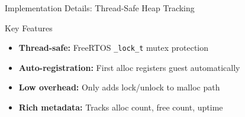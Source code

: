 \documentclass[aspectratio=169, 10pt]{beamer}
\begin{document}
\begin{frame}{Implementation Details: Thread-Safe Heap Tracking}
    \vspace{0.1cm}
    \begin{exampleblock}{Key Features}
        \begin{itemize}\setlength{\itemsep}{2pt}
            \item \textbf{Thread-safe:} FreeRTOS \texttt{\_lock\_t} mutex protection
            \item \textbf{Auto-registration:} First alloc registers guest automatically
            \item \textbf{Low overhead:} Only adds lock/unlock to malloc path
            \item \textbf{Rich metadata:} Tracks alloc count, free count, uptime
        \end{itemize}
    \end{exampleblock}
\end{frame}
\end{document}
